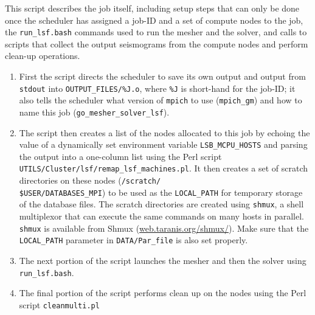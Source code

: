 \documentclass[oneside,english]{book}
\newcommand{\urlwithparentheses}[1]{(\url{#1})}
\begin{document}
This script describes the job itself, including setup steps that can
only be done once the scheduler has assigned a job-ID and a set of
compute nodes to the job, the \texttt{run\_lsf.bash} commands used
to run the mesher and the solver, and calls to scripts that collect
the output seismograms from the compute nodes and perform clean-up
operations.

\begin{enumerate}
\item First the script directs the scheduler to save its own output and
output from \texttt{stdout} into \texttt{\small OUTPUT\_FILES/\%J.o},
where \texttt{\%J} is short-hand for the job-ID; it also tells the
scheduler what version of \texttt{mpich} to use (\texttt{mpich\_gm})
and how to name this job (\texttt{go\_mesher\_solver\_lsf}).
\item The script then creates a list of the nodes allocated to this job
by echoing the value of a dynamically set environment variable \texttt{LSB\_MCPU\_HOSTS}
and parsing the output into a one-column list using the Perl script
\texttt{UTILS/Cluster/lsf/remap\_lsf\_machines.pl}. It then creates a set of scratch
directories on these nodes (\texttt{\small /scratch/}~\\
\texttt{\small \$USER/DATABASES\_MPI}) to be used as the \texttt{LOCAL\_PATH}
for temporary storage of the database files. The scratch directories
are created using \texttt{shmux}, a shell multiplexor that can execute
the same commands on many hosts in parallel. \texttt{shmux} is available
from Shmux \urlwithparentheses{web.taranis.org/shmux/}. Make sure that the \texttt{LOCAL\_PATH}
parameter in \texttt{DATA/Par\_file} is also set properly.
\item The next portion of the script launches the mesher and then the solver
using \texttt{run\_lsf.bash}.
\item The final portion of the script performs clean up on the nodes using
the Perl script \texttt{cleanmulti.pl}
\end{enumerate}
\end{document}
